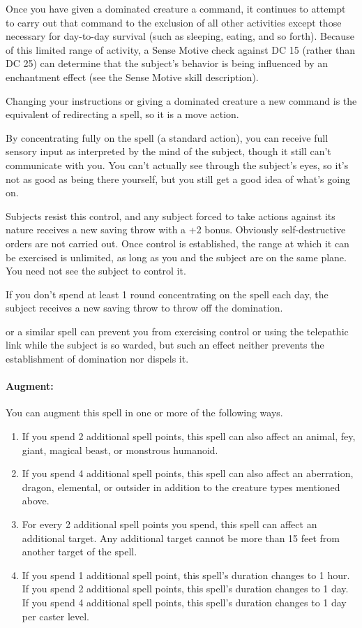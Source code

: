 Once you have given a dominated creature a command, 
it continues to attempt to carry out that command to the exclusion of all other activities except those necessary for day-to-day survival 
(such as sleeping, eating, and so forth). 
Because of this limited range of activity, a Sense Motive check against DC 15 (rather than DC 25) 
can determine that the subject's behavior is being influenced by an enchantment effect (see the Sense Motive skill description).

Changing your instructions or giving a dominated creature a new command is the equivalent of redirecting a spell, so it is a move action.

By concentrating fully on the spell (a standard action), 
you can receive full sensory input as interpreted by the mind of the subject, though it still can't communicate with you. 
You can't actually see through the subject's eyes, so it's not as good as being there yourself, but you still get a good idea of what's going on.

Subjects resist this control, and any subject forced to take actions against its nature receives a new saving throw with a +2 bonus. 
Obviously self-destructive orders are not carried out. 
Once control is established, the range at which it can be exercised is unlimited, as long as you and the subject are on the same plane. 
You need not see the subject to control it.

If you don't spend at least 1 round concentrating on the spell each day, the subject receives a new saving throw to throw off the domination.

 or a similar spell can prevent you from exercising control or using the telepathic link while the subject is so warded, 
but such an effect neither prevents the establishment of domination nor dispels it.

\paragraph{Augment:} You can augment this spell in one or more of the following ways.
\begin{enumerate}
 \item If you spend 2 additional spell points, this spell can also affect an animal, fey, giant, magical beast, or monstrous humanoid.
 \item If you spend 4 additional spell points, this spell can also affect an aberration, 
 dragon, elemental, or outsider in addition to the creature types mentioned above.
 \item For every 2 additional spell points you spend, this spell can affect an additional target. 
 Any additional target cannot be more than 15 feet from another target of the spell.
 \item If you spend 1 additional spell point, this spell's duration changes to 1 hour.
 If you spend 2 additional spell points, this spell's duration changes to 1 day. 
 If you spend 4 additional spell points, this spell's duration changes to 1 day per caster level.
\end{enumerate}

